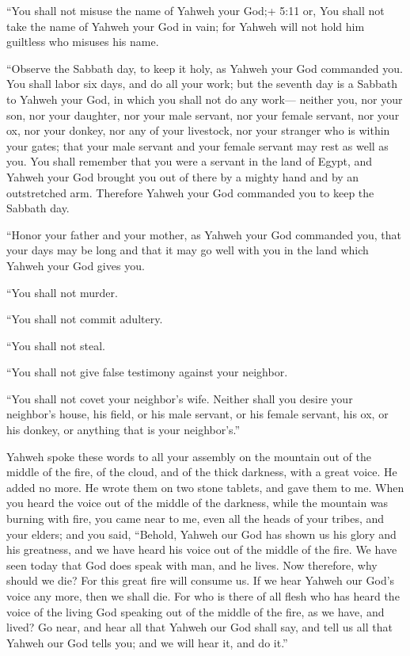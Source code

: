  ``You shall not misuse the name of Yahweh your God;+ 5:11
or, You shall not take the name of Yahweh your God in vain; for Yahweh
will not hold him guiltless who misuses his name.

 ``Observe the Sabbath day, to keep it holy, as Yahweh your
God commanded you.  You shall labor six days, and do all
your work;  but the seventh day is a Sabbath to Yahweh your
God, in which you shall not do any work--- neither you, nor your son,
nor your daughter, nor your male servant, nor your female servant, nor
your ox, nor your donkey, nor any of your livestock, nor your stranger
who is within your gates; that your male servant and your female servant
may rest as well as you.  You shall remember that you were
a servant in the land of Egypt, and Yahweh your God brought you out of
there by a mighty hand and by an outstretched arm. Therefore Yahweh your
God commanded you to keep the Sabbath day.

 ``Honor your father and your mother, as Yahweh your God
commanded you, that your days may be long and that it may go well with
you in the land which Yahweh your God gives you.

 ``You shall not murder.

 ``You shall not commit adultery.

 ``You shall not steal.

 ``You shall not give false testimony against your
neighbor.

 ``You shall not covet your neighbor's wife. Neither shall
you desire your neighbor's house, his field, or his male servant, or his
female servant, his ox, or his donkey, or anything that is your
neighbor's.''

 Yahweh spoke these words to all your assembly on the
mountain out of the middle of the fire, of the cloud, and of the thick
darkness, with a great voice. He added no more. He wrote them on two
stone tablets, and gave them to me.  When you heard the
voice out of the middle of the darkness, while the mountain was burning
with fire, you came near to me, even all the heads of your tribes, and
your elders;  and you said, ``Behold, Yahweh our God has
shown us his glory and his greatness, and we have heard his voice out of
the middle of the fire. We have seen today that God does speak with man,
and he lives.  Now therefore, why should we die? For this
great fire will consume us. If we hear Yahweh our God's voice any more,
then we shall die.  For who is there of all flesh who has
heard the voice of the living God speaking out of the middle of the
fire, as we have, and lived?  Go near, and hear all that
Yahweh our God shall say, and tell us all that Yahweh our God tells you;
and we will hear it, and do it.''

